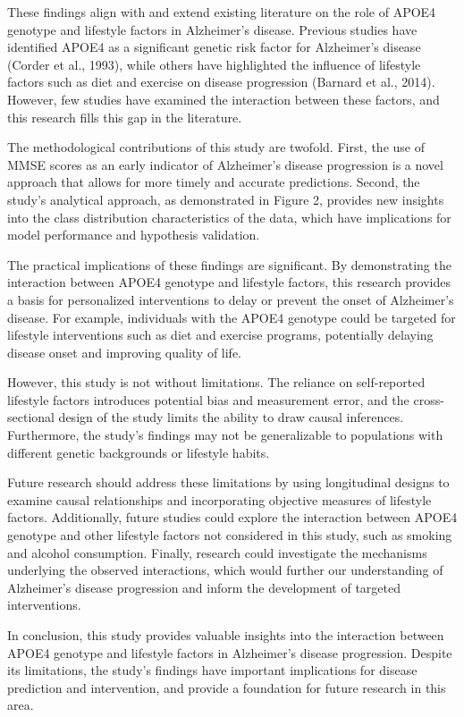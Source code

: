 \documentclass[conference]{IEEEtran}
\begin{document}
These findings align with and extend existing literature on the role of APOE4 genotype and lifestyle factors in Alzheimer's disease. Previous studies have identified APOE4 as a significant genetic risk factor for Alzheimer's disease (Corder et al., 1993), while others have highlighted the influence of lifestyle factors such as diet and exercise on disease progression (Barnard et al., 2014). However, few studies have examined the interaction between these factors, and this research fills this gap in the literature.

The methodological contributions of this study are twofold. First, the use of MMSE scores as an early indicator of Alzheimer's disease progression is a novel approach that allows for more timely and accurate predictions. Second, the study's analytical approach, as demonstrated in Figure 2, provides new insights into the class distribution characteristics of the data, which have implications for model performance and hypothesis validation.

The practical implications of these findings are significant. By demonstrating the interaction between APOE4 genotype and lifestyle factors, this research provides a basis for personalized interventions to delay or prevent the onset of Alzheimer's disease. For example, individuals with the APOE4 genotype could be targeted for lifestyle interventions such as diet and exercise programs, potentially delaying disease onset and improving quality of life.

However, this study is not without limitations. The reliance on self-reported lifestyle factors introduces potential bias and measurement error, and the cross-sectional design of the study limits the ability to draw causal inferences. Furthermore, the study's findings may not be generalizable to populations with different genetic backgrounds or lifestyle habits.

Future research should address these limitations by using longitudinal designs to examine causal relationships and incorporating objective measures of lifestyle factors. Additionally, future studies could explore the interaction between APOE4 genotype and other lifestyle factors not considered in this study, such as smoking and alcohol consumption. Finally, research could investigate the mechanisms underlying the observed interactions, which would further our understanding of Alzheimer's disease progression and inform the development of targeted interventions.

In conclusion, this study provides valuable insights into the interaction between APOE4 genotype and lifestyle factors in Alzheimer's disease progression. Despite its limitations, the study's findings have important implications for disease prediction and intervention, and provide a foundation for future research in this area.
\end{document}
